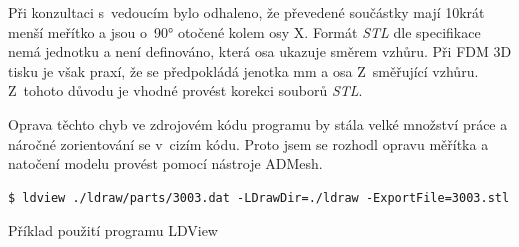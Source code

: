 Při konzultaci s~vedoucím bylo odhaleno, že převedené součástky mají 10krát menší meřítko a jsou o~90° otočené kolem osy X. Formát \textit{\gls{STL}} dle specifikace \autocite{stl:specification} nemá jednotku a není definováno, která osa ukazuje směrem vzhůru. Při \gls{FDM} 3D tisku je však praxí, že se předpokládá jenotka mm a osa Z~směřující vzhůru. Z~tohoto důvodu je vhodné provést korekci souborů \textit{STL}.

Oprava těchto chyb ve zdrojovém kódu programu by stála velké množství práce a náročné zorientování se v~cizím kódu. Proto jsem se rozhodl opravu měřítka a natočení modelu provést pomocí nástroje ADMesh. 

 \begin{listing}[htbp]
        \begin{verbatim}
$ ldview ./ldraw/parts/3003.dat -LDrawDir=./ldraw -ExportFile=3003.stl 
        \end{verbatim}
    \caption{Příklad použití programu LDView \label{priklad-ldview}}
\end{listing}


